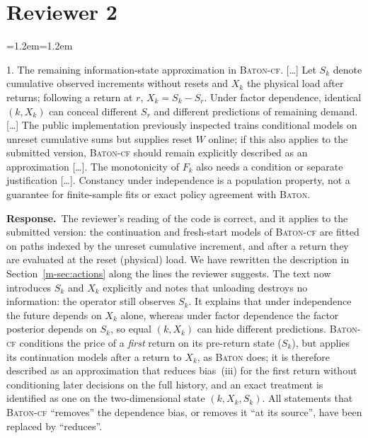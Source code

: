 \documentclass[11pt]{article}
\newenvironment{comment}{\par\medskip\noindent\color{rev}\itshape
  \begin{list}{}{\leftmargin=1.2em\rightmargin=1.2em}\item[]}%
  {\end{list}\par}
\newcommand{\resp}{\par\noindent\textbf{Response.}\ }
\newcommand{\sref}[1]{Section~\ref{m-#1}}
\begin{document}
\section*{Reviewer 2}

\begin{comment}
1. The remaining information-state approximation in \textsc{Baton-cf}.
[\ldots] Let $S_k$ denote cumulative observed increments without resets
and $X_k$ the physical load after returns; following a return at $r$,
$X_k = S_k - S_r$. Under factor dependence, identical $(k, X_k)$ can
conceal different $S_r$ and different predictions of remaining demand.
[\ldots] The public implementation previously inspected trains
conditional models on unreset cumulative sums but supplies reset $W$
online; if this also applies to the submitted version, \textsc{Baton-cf}
should remain explicitly described as an approximation [\ldots]. The
monotonicity of $F_k$ also needs a condition or separate justification
[\ldots]. Constancy under independence is a population property, not a
guarantee for finite-sample fits or exact policy agreement with
\textsc{Baton}.
\end{comment}
\resp The reviewer's reading of the code is correct, and it applies to
the submitted version: the continuation and fresh-start models of
\textsc{Baton-cf} are fitted on paths indexed by the unreset cumulative
increment, and after a return they are evaluated at the reset (physical)
load. We have rewritten the description in \sref{sec:actions} along the
lines the reviewer suggests. The text now introduces $S_k$ and $X_k$
explicitly and notes that unloading destroys no information: the
operator still observes $S_k$. It explains that under independence the
future depends on $X_k$ alone, whereas under factor dependence the
factor posterior depends on $S_k$, so equal $(k, X_k)$ can hide different
predictions. \textsc{Baton-cf} conditions the price of a \emph{first}
return on its pre-return state ($S_k$), but applies its continuation
models after a return to $X_k$, as \textsc{Baton} does; it is therefore
described as an approximation that reduces bias~(iii) for the first
return without conditioning later decisions on the full history, and an
exact treatment is identified as one on the two-dimensional state
$(k, X_k, S_k)$. All statements that \textsc{Baton-cf} ``removes'' the
dependence bias, or removes it ``at its source'', have been replaced by
``reduces''.
\end{document}
